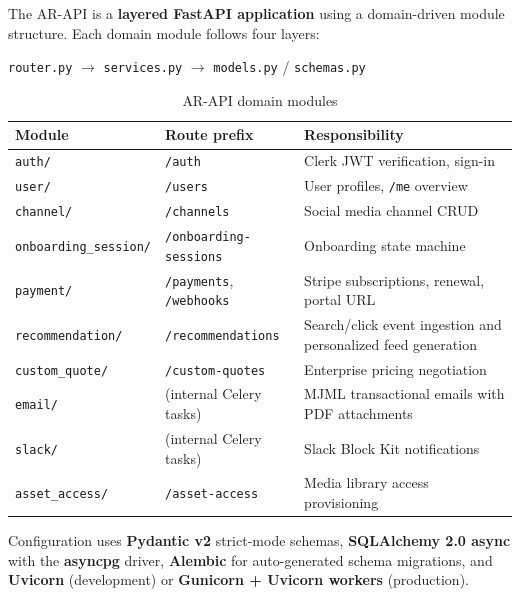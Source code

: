 The AR-API is a \textbf{layered FastAPI application} using a domain-driven module structure.
Each domain module follows four layers:

\begin{center}
\texttt{router.py} $\rightarrow$ \texttt{services.py} $\rightarrow$ \texttt{models.py} / \texttt{schemas.py}
\end{center}

\begin{table}[H]
\centering
\caption{AR-API domain modules}
\begin{tabularx}{\textwidth}{llX}
\toprule
\textbf{Module} & \textbf{Route prefix} & \textbf{Responsibility} \\
\midrule
\texttt{auth/}               & \texttt{/auth}                  & Clerk JWT verification, sign-in \\
\texttt{user/}               & \texttt{/users}                 & User profiles, \texttt{/me} overview \\
\texttt{channel/}            & \texttt{/channels}              & Social media channel CRUD \\
\texttt{onboarding\_session/}& \texttt{/onboarding-sessions}   & Onboarding state machine \\
\texttt{payment/}            & \texttt{/payments}, \texttt{/webhooks} & Stripe subscriptions, renewal, portal URL \\
\texttt{recommendation/}     & \texttt{/recommendations}       & Search/click event ingestion and personalized feed generation \\
\texttt{custom\_quote/}      & \texttt{/custom-quotes}         & Enterprise pricing negotiation \\
\texttt{email/}              & (internal Celery tasks)         & MJML transactional emails with PDF attachments \\
\texttt{slack/}              & (internal Celery tasks)         & Slack Block Kit notifications \\
\texttt{asset\_access/}      & \texttt{/asset-access}          & Media library access provisioning \\
\bottomrule
\end{tabularx}
\end{table}

Configuration uses \textbf{Pydantic v2} strict-mode schemas, \textbf{SQLAlchemy 2.0 async} with
the \textbf{asyncpg} driver, \textbf{Alembic} for auto-generated schema migrations, and
\textbf{Uvicorn} (development) or \textbf{Gunicorn + Uvicorn workers} (production).


